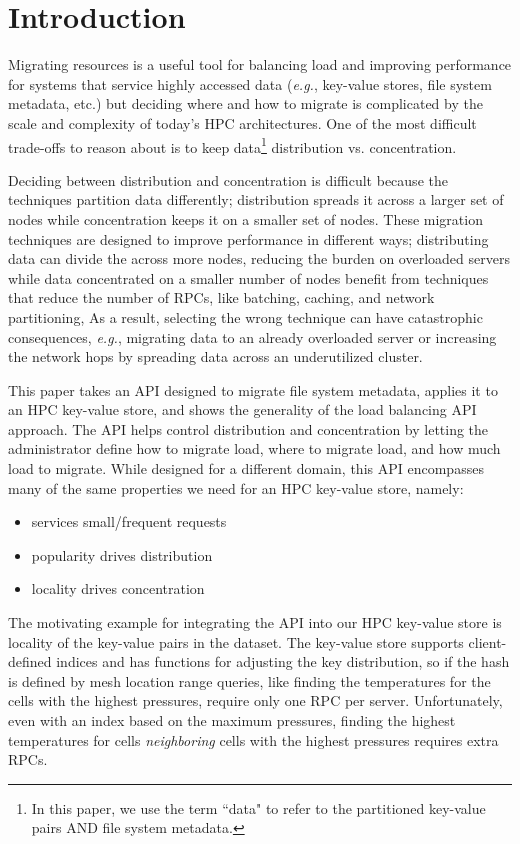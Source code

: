 \section{Introduction}

Migrating resources is a useful tool for balancing load and improving
performance for systems that service highly accessed data ({\it e.g.},
key-value stores, file system metadata, etc.) but deciding where and how to
migrate is complicated by the scale and complexity of today's HPC
architectures. One of the most difficult trade-offs to reason about is to keep
data\footnote{In this paper, we use the term ``data" to refer to the
partitioned key-value pairs AND file system metadata.} distribution vs.
concentration.

Deciding between distribution and concentration is difficult because the
techniques partition data differently; distribution spreads it across a larger
set of nodes while concentration keeps it on a smaller set of nodes.  These
migration techniques are designed to improve performance in different ways;
distributing data can divide the across more nodes, reducing the burden on
overloaded servers while data concentrated on a smaller number of nodes benefit
from techniques that reduce the number of RPCs, like batching, caching, and
network partitioning, As a result, selecting the wrong technique can have
catastrophic consequences, {\it e.g.}, migrating data to an already overloaded
server or increasing the network hops by spreading data across an underutilized
cluster.

This paper takes an API designed to migrate file system metadata, applies it to
an HPC key-value store, and shows the generality of the load balancing API
approach. The API helps control distribution and concentration by letting the
administrator define how to migrate load, where to migrate load, and how much
load to migrate. While designed for a different domain, this API encompasses
many of the same properties we need for an HPC key-value store, namely:

\begin{itemize}
  \item services small/frequent requests
  \item popularity drives distribution
  \item locality drives concentration
\end{itemize}

The motivating example for integrating the API into our HPC key-value store is
locality of the key-value pairs in the dataset. The key-value store supports
client-defined indices and has functions for adjusting the key distribution, so
if the hash is defined by mesh location range queries, like finding the
temperatures for the cells with the highest pressures, require only one RPC per
server. Unfortunately, even with an index based on the maximum pressures,
finding the highest temperatures for cells {\it neighboring} cells with the
highest pressures requires extra RPCs.

